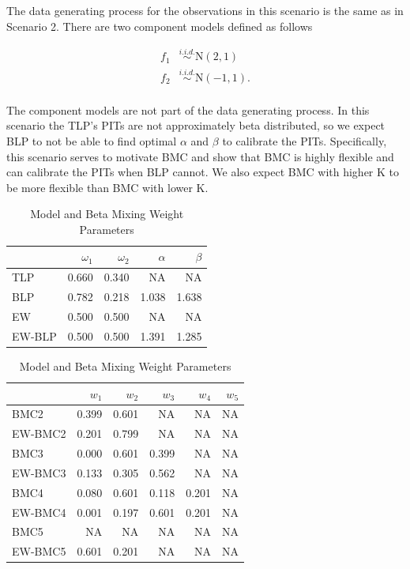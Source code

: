 \documentclass[
]{article}
\begin{document}
The data generating process for the observations in this scenario is the
same as in Scenario 2. There are two component models defined as follows

\[
\begin{aligned}
f_{1}&\overset{i.i.d.}{\sim}\text{N}(2,1)\\
f_{2}&\overset{i.i.d.}{\sim}\text{N}(-1,1).\\
\end{aligned}
\]

The component models are not part of the data generating process. In
this scenario the TLP's PITs are not approximately beta distributed, so
we expect BLP to not be able to find optimal \(\alpha\) and \(\beta\) to
calibrate the PITs. Specifically, this scenario serves to motivate BMC
and show that BMC is highly flexible and can calibrate the PITs when BLP
cannot. We also expect BMC with higher K to be more flexible than BMC
with lower K.

\begin{table}[H]
\caption{\label{tab:unnamed-chunk-18}Model and Beta Mixing Weight Parameters}

\centering
\fontsize{8}{10}\selectfont
\begin{tabular}[t]{lrrrr}
\toprule
  & $\omega_1$ & $\omega_2$ & $\alpha$ & $\beta$\\
\midrule
TLP & 0.660 & 0.340 & NA & NA\\
BLP & 0.782 & 0.218 & 1.038 & 1.638\\
EW & 0.500 & 0.500 & NA & NA\\
EW-BLP & 0.500 & 0.500 & 1.391 & 1.285\\
\bottomrule
\end{tabular}
\centering
\begin{tabular}[t]{lrrrrr}
\toprule
  & $w_1$ & $w_2$ & $w_3$ & $w_4$ & $w_5$\\
\midrule
BMC2 & 0.399 & 0.601 & NA & NA & NA\\
EW-BMC2 & 0.201 & 0.799 & NA & NA & NA\\
BMC3 & 0.000 & 0.601 & 0.399 & NA & NA\\
EW-BMC3 & 0.133 & 0.305 & 0.562 & NA & NA\\
BMC4 & 0.080 & 0.601 & 0.118 & 0.201 & NA\\
\addlinespace
EW-BMC4 & 0.001 & 0.197 & 0.601 & 0.201 & NA\\
BMC5 & NA & NA & NA & NA & NA\\
EW-BMC5 & 0.601 & 0.201 & NA & NA & NA\\
\bottomrule
\end{tabular}
\end{table}
\end{document}

